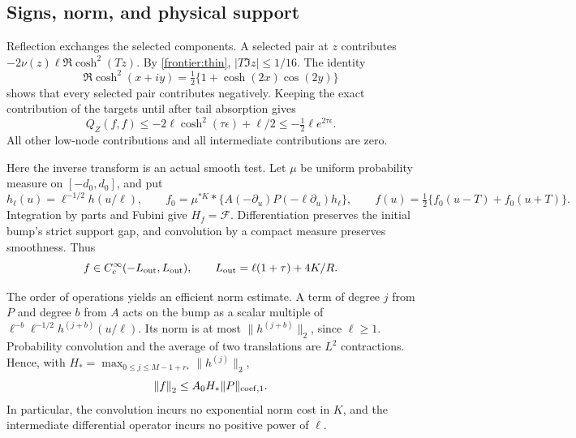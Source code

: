 \subsection{Signs, norm, and physical support}
Reflection exchanges the selected components. A selected pair at
\(z\) contributes
\(-2\nu(z)\ell\Re\cosh^2(Tz)\). By
\eqref{frontier:thin}, \(|T\Im z|\le1/16\). The identity
\[
 \Re\cosh^2(x+iy)=\tfrac12\{1+\cosh(2x)\cos(2y)\}
\]
shows that every selected pair contributes negatively. Keeping the
exact contribution of the targets until after tail absorption gives
\begin{equation}\label{frontier:negative}
 Q_Z(f,f)\le-2\ell\cosh^2(\tau\epsilon)+\ell/2
                 \le-\tfrac12\ell e^{2\tau\epsilon}.
\end{equation}
All other low-node contributions and all intermediate contributions
are zero.

Here the inverse transform is an actual smooth test. Let \(\mu\)
be uniform probability measure on \([-d_0,d_0]\), and put
\[
 h_\ell(u)=\ell^{-1/2}h(u/\ell),\qquad
 f_0=\mu^{*K}*\{A(-\partial_u)P(-\ell\partial_u)h_\ell\},\qquad
 f(u)=\tfrac12\{f_0(u-T)+f_0(u+T)\}.
\]
Integration by parts and Fubini give \(H_f=\mathcal F\).
Differentiation preserves the initial bump's strict support gap, and
convolution by a compact measure preserves smoothness. Thus
\begin{equation}\label{frontier:support-exact}
 f\in C_c^\infty(-L_{\rm out},L_{\rm out}),\qquad
 L_{\rm out}=\ell(1+\tau)+4K/R.
\end{equation}

The order of operations yields an efficient norm estimate. A term
of degree \(j\) from \(P\) and degree \(b\) from \(A\)
acts on the bump as a scalar multiple of
\(\ell^{-b}\ell^{-1/2}h^{(j+b)}(u/\ell)\). Its norm is at
most \(\|h^{(j+b)}\|_2\), since \(\ell\ge1\). Probability
convolution and the average of two translations are \(L^2\)
contractions. Hence, with
\(H_* =\max_{0\le j\le M-1+r_*}\|h^{(j)}\|_2\),
\begin{equation}\label{frontier:norm}
 \left\|f\right\|_2\le A_0H_*\|P\|_{\operatorname{coef},1}.
\end{equation}
In particular, the convolution incurs no exponential norm cost in
\(K\), and the intermediate differential operator incurs no
positive power of \(\ell\).

